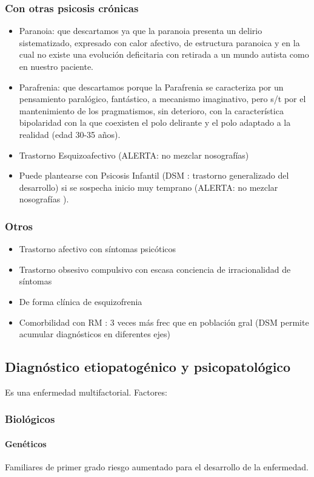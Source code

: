 \subsubsection*{Con otras psicosis crónicas}
\begin{itemize}
    \item Paranoia: que descartamos ya que la paranoia presenta un delirio sistematizado, expresado con calor afectivo, de estructura paranoica y en la cual no existe una evolución deficitaria con retirada a un mundo autista como en nuestro paciente.
    \item Parafrenia: que descartamos porque la Parafrenia se caracteriza por un pensamiento paralógico, fantástico, a mecanismo imaginativo, pero s/t por el mantenimiento de los pragmatismos, sin deterioro, con la característica bipolaridad con la que coexisten el polo delirante y el polo adaptado a la realidad (edad 30-35 años).
    \item Trastorno Esquizoafectivo (\faTrafficLight ALERTA: no mezclar nosografías)
    \item Puede plantearse con Psicosis Infantil (DSM : trastorno generalizado del desarrollo) si se sospecha inicio muy temprano (\faTrafficLight ALERTA: no mezclar nosografías ).
\end{itemize}
\subsubsection*{Otros}
\begin{itemize}
    \item Trastorno afectivo con síntomas psicóticos
    \item Trastorno obsesivo compulsivo con escasa conciencia de irracionalidad de síntomas
    \item De forma clínica de esquizofrenia
    \item Comorbilidad con RM : 3 veces más frec que en población gral (DSM permite acumular diagnósticos en diferentes ejes)
\end{itemize}
\subsection*{Diagnóstico etiopatogénico y psicopatológico}
Es una enfermedad multifactorial. Factores:
\subsubsection*{Biológicos}
\paragraph*{Genéticos}
Familiares de primer grado riesgo aumentado para el desarrollo de la enfermedad.
